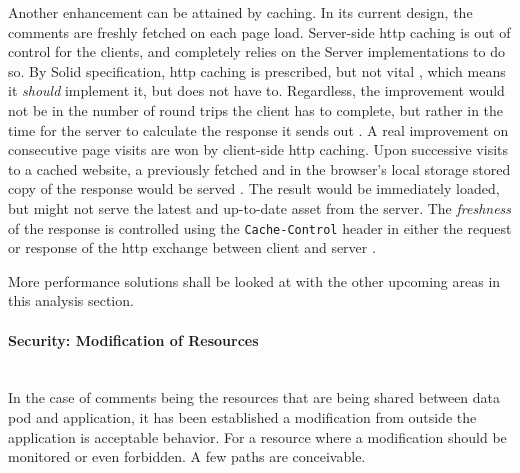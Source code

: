 Another enhancement can be attained by caching. In its current design, the comments are freshly fetched on each page load. Server-side \gls{http} caching is out of control for the clients, and completely relies on the Server implementations to do so. By Solid specification, \gls{http} caching is prescribed, but not vital \cite{solid-protocol}, which means it \textit{should} implement it, but does not have to. Regardless, the improvement would not be in the number of round trips the client has to complete, but rather in the time for the server to calculate the response it sends out \cite{http-caching}. A real improvement on consecutive page visits are won by client-side \gls{http} caching. Upon successive visits to a cached website, a previously fetched and in the browser's local storage stored copy of the response would be served \cite{http-caching}. The result would be immediately loaded, but might not serve the latest and up-to-date asset from the server. The \textit{freshness} of the response is controlled using the \texttt{Cache-Control} header in either the request or response of the \gls{http} exchange between client and server \cite{http-caching}. 

More performance solutions shall be looked at with the other upcoming areas in this analysis section.
\vspace{0.5cm}
\paragraph{Security: Modification of Resources}\mbox{}\\

In the case of comments being the resources that are being shared between data pod and application, it has been established a modification from outside the application is acceptable behavior. For a resource where a modification should be monitored or even forbidden. A few paths are conceivable.

